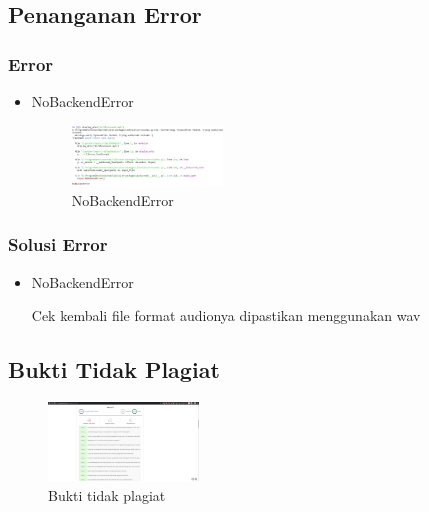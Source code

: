 \subsection{Penanganan Error}
\subsubsection{Error}
\hfill\break
\begin{itemize}
\item NoBackendError

\begin{figure}[H]
\centering
	\includegraphics[width=4cm]{figures/1174074/6/error1.jpg}
\caption{NoBackendError}
\end{figure}
\end{itemize}
\subsubsection{Solusi Error}
\hfill\break
\begin{itemize}
\item NoBackendError

Cek kembali file format audionya dipastikan menggunakan wav
\end{itemize}

\subsection{Bukti Tidak Plagiat}
\begin{figure}[H]
	\includegraphics[width=4cm]{figures/1174074/6/buktiplagiat.jpg}
	\centering
	\caption{Bukti tidak plagiat}
\end{figure}
